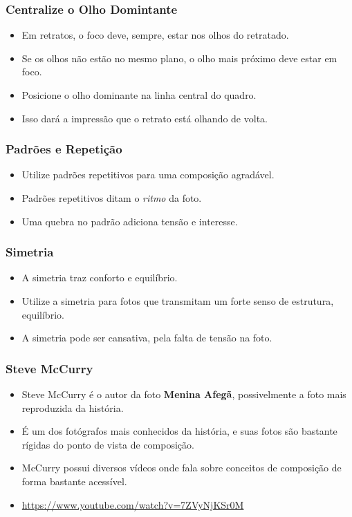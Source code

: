 \begin{frame}
    \frametitle{Centralize o Olho Domintante}
    \begin{itemize}
      \item Em retratos, o foco deve, sempre, estar nos olhos do retratado.
      \item Se os olhos não estão no mesmo plano, o olho mais próximo deve estar em foco.
      \item Posicione o olho dominante na linha central do quadro.
      \item Isso dará a impressão que o retrato está olhando de volta.
    \end{itemize}
\end{frame}

\begin{frame}
    \frametitle{Padrões e Repetição}
    \begin{itemize}
      \item Utilize padrões repetitivos para uma composição agradável.
      \item Padrões repetitivos ditam o \textit{ritmo} da foto.
      \item Uma quebra no padrão adiciona tensão e interesse.
    \end{itemize}
\end{frame}

\begin{frame}
    \frametitle{Simetria}
    \begin{itemize}
      \item A simetria traz conforto e equilíbrio.
      \item Utilize a simetria para fotos que transmitam um forte senso de estrutura, equilíbrio.
      \item A simetria pode ser cansativa, pela falta de tensão na foto.
    \end{itemize}
\end{frame}

\begin{frame}
    \frametitle{Steve McCurry}
    \begin{itemize}
      \item Steve McCurry é o autor da foto \textbf{Menina Afegã}, possivelmente a foto mais
      reproduzida da história.
      \item É um dos fotógrafos mais conhecidos da história, e suas fotos são bastante
      rígidas do ponto de vista de composição.
      \item McCurry possui diversos vídeos onde fala sobre conceitos de composição de
      forma bastante acessível.
      \item \url{https://www.youtube.com/watch?v=7ZVyNjKSr0M}
    \end{itemize}
\end{frame}

